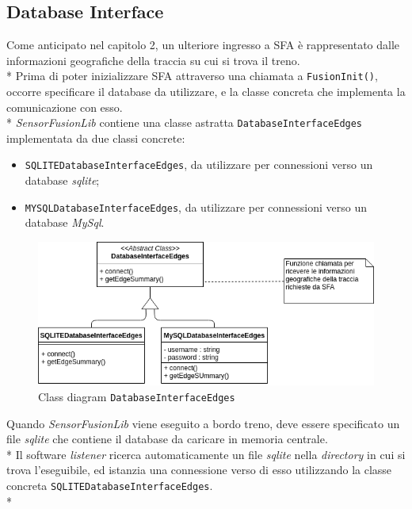 \subsection{Database Interface}
Come anticipato nel capitolo 2, un ulteriore ingresso a SFA \`e rappresentato dalle informazioni geografiche della traccia su cui si trova il treno.\\*
Prima di poter inizializzare SFA attraverso una chiamata a \texttt{FusionInit()}, occorre specificare il database da utilizzare, e la classe concreta che implementa la comunicazione con esso.\\*
\emph{SensorFusionLib} contiene una classe astratta \texttt{DatabaseInterfaceEdges} implementata da due classi concrete:
\begin{itemize}
	\item \texttt{SQLITEDatabaseInterfaceEdges}, da utilizzare per connessioni verso un database \textit{sqlite};
	\item \texttt{MYSQLDatabaseInterfaceEdges}, da utilizzare per connessioni verso un database \textit{MySql}.
\end{itemize}
\begin{figure}[h]
	\centering
	\includegraphics[width=0.7\linewidth]{img/dbintface}
	\caption{Class diagram \texttt{DatabaseInterfaceEdges}}
	\label{fig:dbiface}
\end{figure}
Quando \emph{SensorFusionLib} viene eseguito a bordo treno, deve essere specificato un file \textit{sqlite} che contiene il database da caricare in memoria centrale.\\*
Il software \emph{listener} ricerca automaticamente un file \textit{sqlite} nella \emph{directory} in cui si trova l'eseguibile, ed istanzia una connessione verso di esso utilizzando la classe concreta \texttt{SQLITEDatabaseInterfaceEdges}.\\*
